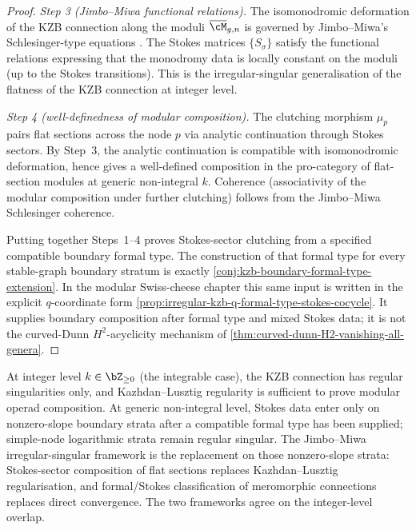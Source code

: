 \begin{proof}
\emph{Step 3 (Jimbo--Miwa functional relations).}
The isomonodromic deformation of the KZB connection along the
moduli \(\overline{\cM}_{g,n}\) is governed by Jimbo--Miwa's
Schlesinger-type equations
\cite{JMU81}. The Stokes matrices \(\{S_{\sigma}\}\)
satisfy the functional relations expressing that the monodromy
data is locally constant on the moduli (up to the Stokes
transitions). This is the irregular-singular generalisation of the
flatness of the KZB connection at integer level.

\emph{Step 4 (well-definedness of modular composition).}
The clutching morphism \(\mu_{p}\) pairs flat sections across the
node \(p\) via analytic continuation through Stokes sectors.
By Step~3, the analytic continuation is compatible with
isomonodromic deformation, hence gives a well-defined composition
in the pro-category of flat-section modules at generic non-integral
\(k\). Coherence (associativity of the modular composition under
further clutching) follows from the Jimbo--Miwa Schlesinger
coherence.

Putting together Steps~1--4 proves Stokes-sector clutching from a
specified compatible boundary formal type. The construction of
that formal type for every stable-graph boundary stratum is exactly
\autoref{conj:kzb-boundary-formal-type-extension}. In the modular
Swiss-cheese chapter this same input is written in the explicit
\(q\)-coordinate form
\autoref{prop:irregular-kzb-q-formal-type-stokes-cocycle}. It
supplies boundary composition after formal type and mixed Stokes data;
it is not the curved-Dunn \(H^{2}\)-acyclicity mechanism of
\autoref{thm:curved-dunn-H2-vanishing-all-genera}.
\end{proof}

\begin{remark}
\label{rem:integral-vs-irregular}
At integer level \(k \in \bZ_{\ge 0}\) (the integrable case), the
KZB connection has regular singularities only, and
Kazhdan--Lusztig regularity is sufficient to prove modular operad
composition. At generic non-integral level, Stokes data enter only
on nonzero-slope boundary strata after a compatible formal type has
been supplied; simple-node logarithmic strata remain regular
singular. The Jimbo--Miwa irregular-singular framework is the
replacement on those nonzero-slope strata: Stokes-sector composition
of flat sections replaces Kazhdan--Lusztig regularisation, and
formal/Stokes classification of meromorphic connections replaces
direct convergence. The two frameworks agree on the integer-level
overlap.
\end{remark}

